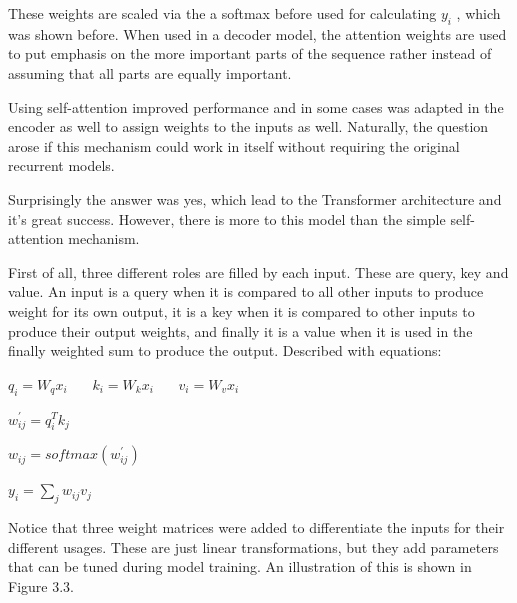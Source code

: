 \documentclass[bsc,frontabs,singlespacing,parskip,deptreport]{infthesis}
\begin{document}
These weights are scaled via the a softmax before used for calculating $ y_i $ , which was shown before. When used in a decoder model, the attention weights are used to put emphasis on the more important parts of the sequence rather instead of assuming that all parts are equally important.

Using self-attention improved performance and in some cases was adapted in the encoder as well to assign weights to the inputs as well. Naturally, the question arose if this mechanism could work in itself without requiring the original recurrent models.

Surprisingly the answer was yes, which lead to the Transformer architecture and it's great success. However, there is more to this model than the simple self-attention mechanism. 

First of all, three different roles are filled by each input. These are query, key and value. An input is a query when it is compared to all other inputs to produce weight for its own output, it is a key when it is compared to other inputs to produce their output weights, and finally it is a value when it is used in the finally weighted sum to produce the output. Described with equations:

\begin{center}
$ q_i = W_q x_i ~~~~~~~~ k_i = W_k x_i ~~~~~~~~ v_i = W_v x_i $

$ w_{ij}^\prime = q_i^T k_j $

$ w_{ij} = softmax(w_{ij}^\prime)$

$ y_i = \sum_{j} w_{ij} v_j $
\end{center}

Notice that three weight matrices were added to differentiate the inputs for their different usages. These are just linear transformations, but they add parameters that can be tuned during model training. An illustration of this is shown in Figure 3.3. 
\end{document}

